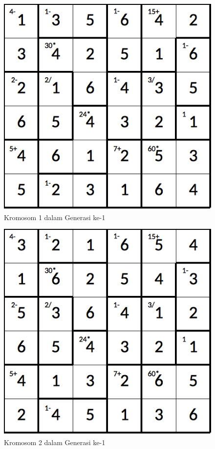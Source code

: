 \clearpage

\begin{figure}
\centering
\captionsetup{justification=centering}
\includegraphics[scale=0.333]{Gambar/hybridgenetic/Generation1Chromosome1}
\caption[Kromosom 1 dalam Generasi ke-1]{Kromosom 1 dalam Generasi ke-1}
\label{fig:analisisg1k1}
\end{figure}

\begin{figure}
\centering
\captionsetup{justification=centering}
\includegraphics[scale=0.333]{Gambar/hybridgenetic/Generation1Chromosome2}
\caption[Kromosom 2 dalam Generasi ke-1]{Kromosom 2 dalam Generasi ke-1}
\label{fig:analisisg1k2}
\end{figure}

